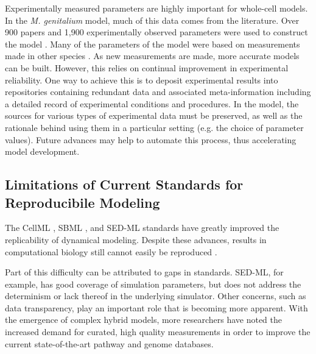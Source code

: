 \documentclass[journal,transmag,twoside]{IEEEtran}
\begin{document}
Experimentally measured parameters are highly important for whole-cell models.
In the \textit{M. genitalium} model, much of this data comes from the literature.
Over 900 papers and 1,900 experimentally observed parameters were used to construct the model \cite{Karr2012}.
Many of the parameters of the model were based on measurements made in other species \cite{macklin2014future}.
As new measurements are made, more accurate models can be built.
However, this relies on continual improvement in experimental reliability.
One way to achieve this is to deposit experimental results into repositories
containing redundant data and associated meta-information including
a detailed record of experimental conditions and procedures.
In the model, the sources for various types of experimental data must be preserved,
as well as the rationale behind using them in a particular setting
(e.g. the choice of parameter values).
Future advances may help to automate this process, thus accelerating model development.

\subsection{Limitations of Current Standards for Reproducibile Modeling}

The CellML \cite{cuellar2003overview}, SBML \cite{hucka2003}, and SED-ML \cite{sedml2011} standards have greatly improved the replicability of dynamical modeling.
Despite these advances, results in computational biology still cannot easily be reproduced \cite{garijo2013quantifying}.

Part of this difficulty can be attributed to gaps in standards.
SED-ML, for example, has good coverage of simulation parameters, but
does not address the determinism or lack thereof in the underlying simulator.
Other concerns, such as data transparency, play an important role that is becoming more apparent.
With the emergence of complex hybrid models, more researchers have noted the increased demand for curated, high quality measurements in order to improve the current state-of-the-art pathway and genome databases.
\end{document}
